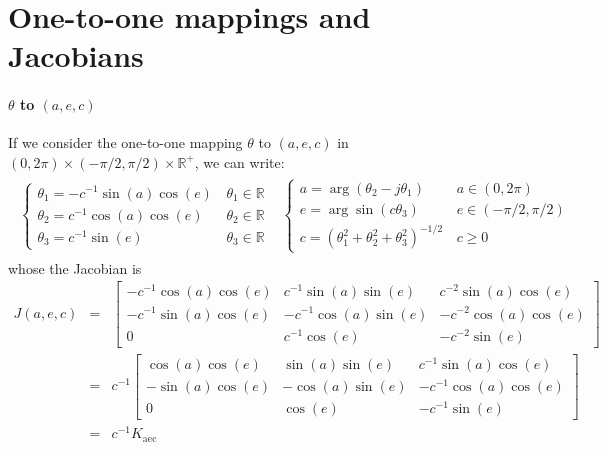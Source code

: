 \documentclass[a4paper, 12pt]{report}
\def\aec{\mathrm{aec}}
\begin{document}
\chapter{One-to-one mappings and Jacobians}
\subsubsection{$\theta$ to $(a,e,c)$ }
If we consider the one-to-one mapping $\theta$ to $(a,e,c)$ in $(0,2\pi)\times(-\pi/2,\pi/2)\times\mathds{R}^+$, we can write:
\begin{eqnarray*}
\begin{array}{cc}
 \left\{
 \begin{array}{ll}
 \theta_{1}=-c^{-1} \sin(a)\cos(e)&\, \theta_{1}\in\mathds{R}
 \\
 \theta_{2}=c^{-1}  \cos(a)\cos(e)&\,\theta_{2}\in\mathds{R}
 \\
 \theta_{3}=c^{-1}\sin(e)&\, \theta_{3}\in\mathds{R}
 \end{array}\right.
&
 \left\{
 \begin{array}{ll}
 a=\arg(\theta_{2}-j \theta_{1})& \, a\in(0,2\pi)
  \\
e=\arg\sin(c\theta_{3})& \,e\in(-\pi/2,\pi/2)
 \\
 c=(\theta_{1}^{2}+ \theta_{2}^{2}+ \theta_{3}^{2})^{-1/2}& \, c \geq 0
 \end{array}\right.
\end{array}
\end{eqnarray*}
whose the Jacobian is
\begin{eqnarray}
 \label{eq:jacobianaec2theta}
 J(a,e,c)
&= &
 \begin{bmatrix}
-c^{-1}\cos(a)\cos(e)&c^{-1}\sin(a)\sin(e)&c^{-2}\sin(a)\cos(e)
\\
-c^{-1}\sin(a)\cos(e)&-c^{-1}\cos(a)\sin(e)&-c^{-2}\cos(a)\cos(e)
\\
0&c^{-1}\cos(e)&-c^{-2}\sin(e)
\end{bmatrix}
\\
&=&\nonumber
c^{-1}
\begin{bmatrix}
\cos(a)\cos(e)&\sin(a)\sin(e)&c^{-1}\sin(a)\cos(e)
\\
-\sin(a)\cos(e)&-\cos(a)\sin(e)&-c^{-1}\cos(a)\cos(e)
\\
0&\cos(e)&-c^{-1}\sin(e)
\end{bmatrix}
\\
&=&\nonumber
c^{-1}K_{\aec}
\end{eqnarray}
\end{document}
